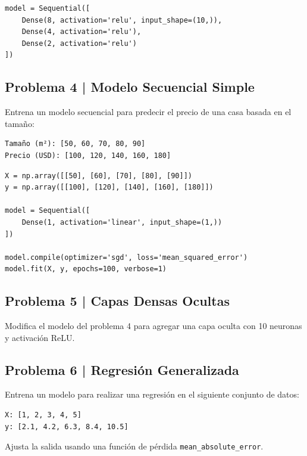 \documentclass{article}
\begin{document}
\begin{lstlisting}[style=python]
model = Sequential([
    Dense(8, activation='relu', input_shape=(10,)),
    Dense(4, activation='relu'),
    Dense(2, activation='relu')
])
\end{lstlisting}

\clearpage

\subsection*{Problema 4 | Modelo Secuencial Simple}

Entrena un modelo secuencial para predecir el precio de una casa basada en el tamaño:

\begin{verbatim}
Tamaño (m²): [50, 60, 70, 80, 90]
Precio (USD): [100, 120, 140, 160, 180]
\end{verbatim}

\begin{lstlisting}[style=python]
X = np.array([[50], [60], [70], [80], [90]])
y = np.array([[100], [120], [140], [160], [180]])

model = Sequential([
    Dense(1, activation='linear', input_shape=(1,))
])

model.compile(optimizer='sgd', loss='mean_squared_error')
model.fit(X, y, epochs=100, verbose=1)
\end{lstlisting}

\clearpage

\subsection*{Problema 5 | Capas Densas Ocultas}

Modifica el modelo del problema 4 para agregar una capa oculta con 10 neuronas y activación ReLU.

\clearpage

\subsection*{Problema 6 | Regresión Generalizada}

Entrena un modelo para realizar una regresión en el siguiente conjunto de datos:

\begin{verbatim}
X: [1, 2, 3, 4, 5]
y: [2.1, 4.2, 6.3, 8.4, 10.5]
\end{verbatim}

Ajusta la salida usando una función de pérdida \texttt{mean\_absolute\_error}.
\end{document}
